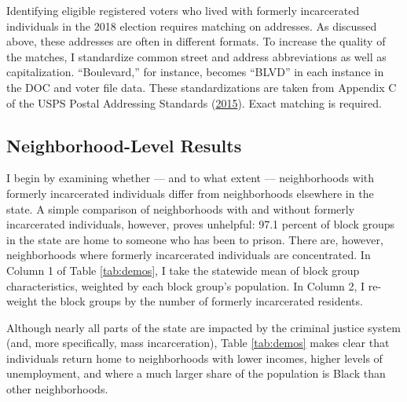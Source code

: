 \documentclass[
  12pt,
]{article}
\begin{document}
Identifying eligible registered voters who lived with formerly incarcerated individuals in the 2018 election requires matching on addresses. As discussed above, these addresses are often in different formats. To increase the quality of the matches, I standardize common street and address abbreviations as well as capitalization. ``Boulevard,'' for instance, becomes ``BLVD'' in each instance in the DOC and voter file data. These standardizations are taken from Appendix C of the USPS Postal Addressing Standards (\protect\hyperlink{ref-USPS2015}{2015}). Exact matching is required.

\hypertarget{neighborhood-level-results}{%
\subsection*{Neighborhood-Level Results}\label{neighborhood-level-results}}

I begin by examining whether --- and to what extent --- neighborhoods with formerly incarcerated individuals differ from neighborhoods elsewhere in the state. A simple comparison of neighborhoods with and without formerly incarcerated individuals, however, proves unhelpful: 97.1 percent of block groups in the state are home to someone who has been to prison. There are, however, neighborhoods where formerly incarcerated individuals are concentrated. In Column 1 of Table \ref{tab:demos}, I take the statewide mean of block group characteristics, weighted by each block group's population. In Column 2, I re-weight the block groups by the number of formerly incarcerated residents.



Although nearly all parts of the state are impacted by the criminal justice system (and, more specifically, mass incarceration), Table \ref{tab:demos} makes clear that individuals return home to neighborhoods with lower incomes, higher levels of unemployment, and where a much larger share of the population is Black than other neighborhoods.
\end{document}
